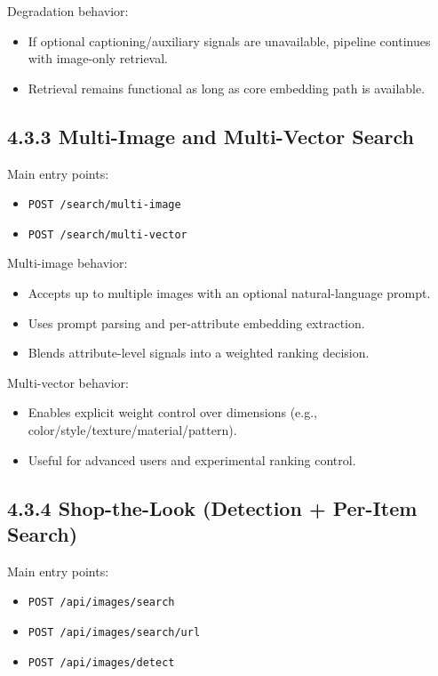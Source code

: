 \documentclass[12pt,a4paper]{report}
\begin{document}
Degradation behavior:

\begin{itemize}
\item If optional captioning/auxiliary signals are unavailable, pipeline continues with image-only retrieval.
\item Retrieval remains functional as long as core embedding path is available.
\end{itemize}

\subsection{4.3.3 Multi-Image and Multi-Vector Search}
Main entry points:

\begin{itemize}
\item \texttt{POST /search/multi-image}
\item \texttt{POST /search/multi-vector}
\end{itemize}

Multi-image behavior:

\begin{itemize}
\item Accepts up to multiple images with an optional natural-language prompt.
\item Uses prompt parsing and per-attribute embedding extraction.
\item Blends attribute-level signals into a weighted ranking decision.
\end{itemize}

Multi-vector behavior:

\begin{itemize}
\item Enables explicit weight control over dimensions (e.g., color/style/texture/material/pattern).
\item Useful for advanced users and experimental ranking control.
\end{itemize}

\subsection{4.3.4 Shop-the-Look (Detection + Per-Item Search)}
Main entry points:

\begin{itemize}
\item \texttt{POST /api/images/search}
\item \texttt{POST /api/images/search/url}
\item \texttt{POST /api/images/detect}
\end{itemize}
\end{document}
